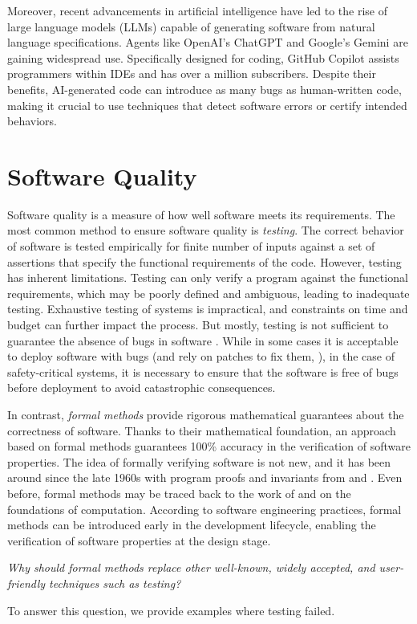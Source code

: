 Moreover, recent advancements in artificial intelligence have led to the rise of large language models (LLMs) capable of generating software from natural language specifications. Agents like OpenAI's ChatGPT and Google's Gemini are gaining widespread use. Specifically designed for coding, GitHub Copilot assists programmers within IDEs and has over a million subscribers. Despite their benefits, AI-generated code can introduce as many bugs as human-written code, making it crucial to use techniques that detect software errors or certify intended behaviors.

\section{Software Quality}

Software quality is a measure of how well software meets its requirements.
The most common method to ensure software quality is \emph{testing}.
The correct behavior of software is tested empirically for finite number of inputs against a set of assertions that specify the functional requirements of the code.
However, testing has inherent limitations.
Testing can only verify a program against the functional requirements, which may be poorly defined and ambiguous, leading to inadequate testing.
Exhaustive testing of systems is impractical, and constraints on time and budget can further impact the process.
But mostly, testing is not sufficient to guarantee the absence of bugs in software .
While in some cases it is acceptable to deploy software with bugs (and rely on patches to fix them, ), in the case of safety-critical systems, it is necessary to ensure that the software is free of bugs before deployment to avoid catastrophic consequences.

In contrast, \emph{formal methods} provide rigorous mathematical guarantees about the correctness of software.
Thanks to their mathematical foundation, an approach based on formal methods guarantees 100\% accuracy in the verification of software properties.
The idea of formally verifying software is not new, and it has been around since the late 1960s with program proofs and invariants from  and .
Even before, formal methods may be traced back to the work of  and  on the foundations of computation.
According to software engineering practices, formal methods can be introduced early in the development lifecycle, enabling the verification of software properties at the design stage.
%
\begin{center}\em
  Why should formal methods replace other well-known, widely accepted, and user-friendly techniques such as testing?
\end{center}
To answer this question, we provide examples where testing failed.


